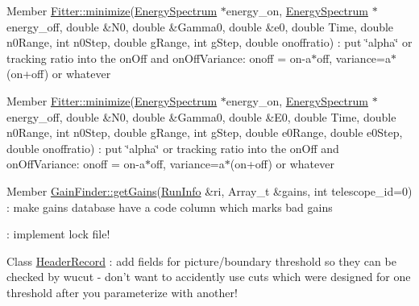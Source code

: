 \label{todo__todo000015}
\hypertarget{todo__todo000015}{}
 
\begin{DoxyDescription}
\item[Member \hyperlink{classFitter_a88492ebdbfa181370dc05a584ec9a040}{Fitter::minimize}(\hyperlink{classEnergySpectrum}{EnergySpectrum} $\ast$energy\_\-on, \hyperlink{classEnergySpectrum}{EnergySpectrum} $\ast$energy\_\-off, double \&N0, double \&Gamma0, double \&e0, double Time, double n0Range, int n0Step, double gRange, int gStep, double onoffratio) ]: put \char`\"{}alpha\char`\"{} or tracking ratio into the onOff and onOffVariance: onoff = on-\/a$\ast$off, variance=a$\ast$(on+off) or whatever
\end{DoxyDescription}

\label{todo__todo000018}
\hypertarget{todo__todo000018}{}
 
\begin{DoxyDescription}
\item[Member \hyperlink{classFitter_a6f93aeb7b89a67f368cfa03abdce3e5a}{Fitter::minimize}(\hyperlink{classEnergySpectrum}{EnergySpectrum} $\ast$energy\_\-on, \hyperlink{classEnergySpectrum}{EnergySpectrum} $\ast$energy\_\-off, double \&N0, double \&Gamma0, double \&E0, double Time, double n0Range, int n0Step, double gRange, int gStep, double e0Range, double e0Step, double onoffratio) ]: put \char`\"{}alpha\char`\"{} or tracking ratio into the onOff and onOffVariance: onoff = on-\/a$\ast$off, variance=a$\ast$(on+off) or whatever
\end{DoxyDescription}

\label{todo__todo000019}
\hypertarget{todo__todo000019}{}
 
\begin{DoxyDescription}
\item[Member \hyperlink{classGainFinder_a093922ed07e211199e2e3afdc4b6b2d4}{GainFinder::getGains}(\hyperlink{classRunInfo}{RunInfo} \&ri, Array\_\-t \&gains, int telescope\_\-id=0) ]: make gains database have a code column which marks bad gains 

: implement lock file! 
\end{DoxyDescription}

\label{todo__todo000010}
\hypertarget{todo__todo000010}{}
 
\begin{DoxyDescription}
\item[Class \hyperlink{structHeaderRecord}{HeaderRecord} ]: add fields for picture/boundary threshold so they can be checked by wucut -\/ don't want to accidently use cuts which were designed for one threshold after you parameterize with another! 
\end{DoxyDescription}

